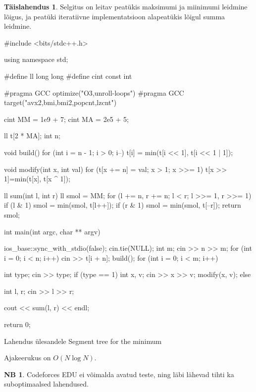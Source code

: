 \documentclass{trkut}
\theoremstyle{definition}
\newtheorem*{extra}{NB}
\newtheorem*{solution}{Täislahendus}
\begin{document}
\begin{solution}
Selgitus on leitav peatükis maksimumi ja miinimumi leidmine lõigus, ja peatüki iteratiivne implementatsioon alapeatükis lõigul summa leidmine.
\end{solution}

\begin{cclol}
#include <bits/stdc++.h>

using namespace std;

#define ll long long
#define cint
const int

#pragma GCC optimize("O3,unroll-loops")
#pragma GCC target("avx2,bmi,bmi2,popcnt,lzcnt")

cint MM = 1e9 + 7;
cint MA = 2e5 + 5;

ll t[2 * MA];
int n;

void build() {
  for (int i = n - 1; i > 0; i--) {
    t[i] = min(t[i << 1], t[i << 1 | 1]);
  }
}

void modify(int x, int val) {
for (t[x += n] = val; x > 1; x >>= 1) t[x >> 1]=min(t[x], t[x ^ 1]);
}

ll sum(int l, int r) {
  ll smol = MM;
  for (l += n, r += n; l < r; l >>= 1, r >>= 1) {
    if (l & 1) smol = min(smol, t[l++]);
    if (r & 1) smol = min(smol, t[--r]);
  }
  return smol;
}

int main(int argc, char ** argv) {
  ios_base::sync_with_stdio(false);
  cin.tie(NULL);
  int m;
  cin >> n >> m;
  for (int i = 0; i < n; i++) {
    cin >> t[i + n];
  }
  build();
  for (int i = 0; i < m; i++) {
    int type;
    cin >> type;
    if (type == 1) {
      int x, v;
      cin >> x >> v;
      modify(x, v);
    } else {
      int l, r;
      cin >> l >> r;

      cout << sum(l, r) << endl;
    }
  }

  return 0;
}
    \end{cclol}
    \begin{kk}[H]
    \caption{Lahendus ülesandele Segment tree for the minimum}%
    \end{kk}
    
Ajakeerukus on $O(N\log N)$.

\begin{extra}%
Codeforces EDU ei võimalda avatud teste, ning läbi lähevad tihti ka suboptimaalsed lahendused.
\end{extra}
\end{document}
